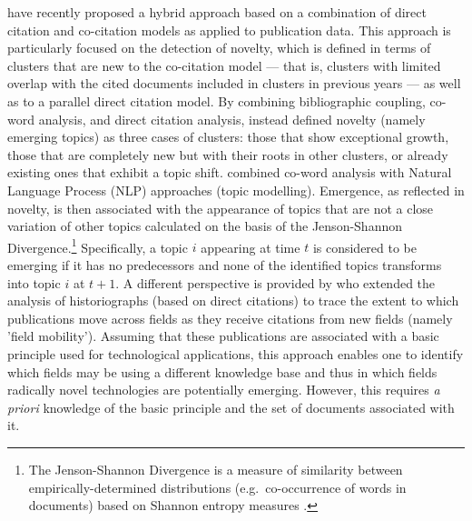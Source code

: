 \documentclass[11pt]{article}
\begin{document}
\cite{Small2014} have recently proposed a hybrid approach based on a combination of direct citation and co-citation models as applied to publication data. This approach is particularly focused on the detection of novelty, which is defined in terms of clusters that are new to the co-citation model --- that is, clusters with limited overlap with the cited documents included in clusters in previous years \citep{Boyack2014} --- as well as to a parallel direct citation model. By combining bibliographic coupling, co-word analysis, and direct citation analysis, \cite{Glanzel2012} instead defined novelty (namely emerging topics) as three cases of clusters: those that show exceptional growth, those that are completely new but with their roots in other clusters, or already existing ones that exhibit a topic shift.  \cite{Yan2014} combined co-word analysis with Natural Language Process (NLP) approaches (topic modelling). Emergence, as reflected in novelty, is then associated with the appearance of topics that are not a close variation of other topics calculated on the basis of the Jenson-Shannon Divergence.\footnote{The Jenson-Shannon Divergence is a measure of similarity between empirically-determined distributions (e.g.\ co-occurrence of words in documents) based on Shannon entropy measures \citep[for more details see][]{Lin1991}.} Specifically, a topic $i$ appearing at time $t$ is considered to be emerging if it has no predecessors and none of the identified topics transforms into topic $i$ at $t+1$. A different perspective is provided by \cite{Scharnhorst2010} who extended the analysis of historiographs (based on direct citations) to trace the extent to which publications move across fields as they receive citations from new fields (namely 'field mobility'). Assuming that these publications are associated with a basic principle used for technological applications, this approach enables one to identify which fields may be using a different knowledge base and thus in which fields radically novel technologies are potentially emerging. However, this requires \textit{a priori} knowledge of the basic principle and the set of documents associated with it.
\end{document}

